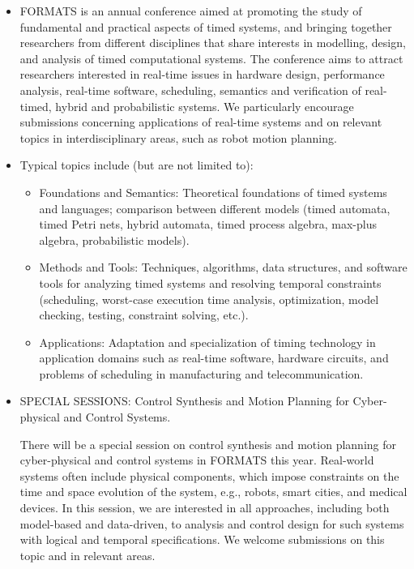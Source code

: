 \documentclass{article}
\begin{document}
\begin{itemize}\item  FORMATS is an annual conference aimed at promoting the study of fundamental and practical aspects of timed systems, and bringing together researchers from different disciplines that share interests in modelling, design, and analysis of timed computational systems. The conference aims to attract researchers interested in real-time issues in hardware design, performance analysis, real-time software, scheduling, semantics and verification of real-timed, hybrid and probabilistic systems. We particularly encourage submissions concerning applications of real-time systems and on relevant topics in interdisciplinary areas, such as robot motion planning. 
 
\item  Typical topics include (but are not limited to): 
 
\begin{itemize}\item  Foundations and Semantics: Theoretical foundations of timed systems and languages; comparison between different models (timed automata, timed Petri nets, hybrid automata, timed process algebra, max-plus algebra, probabilistic models). 
\item  Methods and Tools: Techniques, algorithms, data structures, and software tools for analyzing timed systems and resolving temporal constraints (scheduling, worst-case execution time analysis, optimization, model checking, testing, constraint solving, etc.).
\item  Applications: Adaptation and specialization of timing technology in application domains such as real-time software, hardware circuits, and problems of scheduling in manufacturing and telecommunication.
\end{itemize} 
\item  SPECIAL SESSIONS: Control Synthesis and Motion Planning for Cyber-physical and Control Systems.  
 
  There will be a special session on control synthesis and motion planning for cyber-physical and control systems in FORMATS this year. Real-world systems often include physical components, which impose constraints on the time and space evolution of the system, e.g., robots, smart cities, and medical devices. In this session, we are interested in all approaches, including both model-based and data-driven, to analysis and control design for such systems with logical and temporal specifications. We welcome submissions on this topic and in relevant areas. 
 

\end{itemize}
\end{document}
